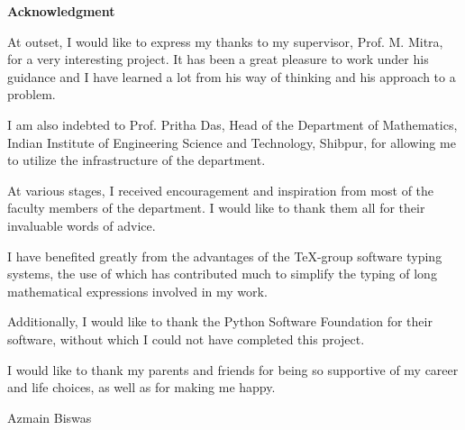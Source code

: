 \vspace{5cm}

\begin{center}
    \LARGE{\textbf{Acknowledgment}}
\end{center}
\vspace{2cm}
    At outset, I would like to express my thanks to my supervisor, Prof. M. Mitra, for a very interesting project. It has been a great pleasure to work under his guidance and I have learned a lot from his way of thinking and his approach to a problem. 
    \vspace{0.2cm}

    I am also indebted to Prof. Pritha Das, Head of the Department of Mathematics, Indian Institute of Engineering Science and Technology, Shibpur, for allowing me to utilize the infrastructure of the department. 

    \vspace{0.2cm}
    At various stages, I received encouragement and inspiration from most of the faculty members of the department. I would like to thank them all for their invaluable words of advice.

    \vspace{0.2cm}
    I have benefited greatly from the advantages of the \TeX-group software typing systems, the use of which has contributed much to simplify the typing of long mathematical expressions involved in my work.

    \vspace{0.2cm}
    Additionally, I would like to thank the Python Software Foundation for their software, without which I could not have completed this project.

    \vspace{0.2cm}
    I would like to thank my parents and friends for being so supportive of my career and life choices, as well as for making me happy.

    \vspace{2cm}
    \begin{flushright}
        Azmain Biswas
    \end{flushright}
